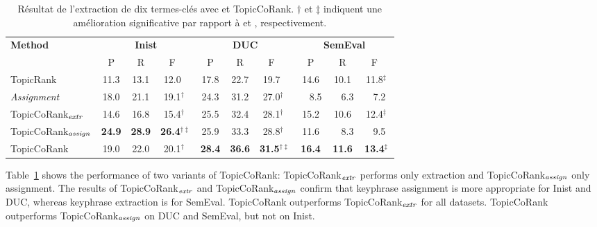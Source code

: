         \begin{table}
          \centering
            \begin{tabular}{l|ccc@{}|ccc@{}|ccc@{~}}
              \toprule
              \multirow{2}{*}{\textbf{Method}} & \multicolumn{3}{c|}{\textbf{Inist}} & \multicolumn{3}{c|}{\textbf{DUC}} & \multicolumn{3}{c}{\textbf{SemEval}}\\
              \cline{2-10}
              & P & R & F$^{~~~~}$ & P & R & F$^{~~~~}$ & P & R & F$^{~~}$\\
              \hline
              TopicRank & 11.3 & 13.1 & 12.0$^{~~~~}$ & 17.8 & 22.7 & 19.7$^{~~~~}$ & 14.6 & 10.1 & 11.8$^{\ddagger}$\\
              \textit{Assignment} & 18.0 & 21.1 & 19.1$^{\dagger~~}$ & 24.3 & 31.2 & 27.0$^{\dagger~~}$ & ~~8.5 & ~~6.3 & ~~7.2$^{~~}$\\
              \hline
              TopicCoRank$_\textnormal{\textit{extr}}$ & 14.6 & 16.8 & 15.4$^{\dagger~~}$ & 25.5 & 32.4 & 28.1$^{\dagger~~}$ & 15.2 & 10.6 & 12.4$^{\ddagger}$\\
              TopicCoRank$_\textnormal{\textit{assign}}$ & \textbf{24.9} & \textbf{28.9} & \textbf{26.4$^{\dagger\ddagger}$} & 25.9 & 33.3 & 28.8$^{\dagger~~}$ & 11.6 & ~~8.3 & ~~9.5$^{~~}$\\
              \hline
              TopicCoRank & 19.0 & 22.0 & 20.1$^{\dagger~~}$ & \textbf{28.4} & \textbf{36.6} & \textbf{31.5$^{\dagger\ddagger}$} & \textbf{16.4} & \textbf{11.6} & \textbf{13.4$^{\ddagger}$}\\
              \bottomrule
            \end{tabular}
        \caption[
          Résultat de l'extraction de dix termes-clés avec \TODO{\dots} et
          TopicCoRank
        ]{
          Résultat de l'extraction de dix termes-clés avec \TODO{\dots} et
          TopicCoRank. $\dagger$ et $\ddagger$ indiquent une amélioration
          significative par rapport à \TODO{\dots} et \TODO{\dots},
          respectivement.
          \label{tab:comparison_results}}
        \end{table}
        
        
        Table~\ref{tab:comparison_results} shows the performance of two variants of TopicCoRank: TopicCoRank$_\textnormal{\textit{extr}}$ performs only  extraction
        and  TopicCoRank$_\textnormal{\textit{assign}}$ only assignment.
        The results of TopicCoRank$_\textnormal{\textit{extr}}$ and 
        TopicCoRank$_\textnormal{\textit{assign}}$ confirm that keyphrase assignment is more appropriate for 
        Inist and DUC, whereas keyphrase extraction is for SemEval.
        TopicCoRank outperforms TopicCoRank$_\textnormal{\textit{extr}}$ for all datasets.
        TopicCoRank outperforms TopicCoRank$_\textnormal{\textit{assign}}$ on DUC and SemEval, but not on Inist.
        
